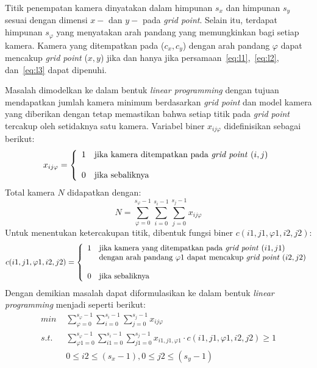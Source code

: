 Titik penempatan kamera dinyatakan dalam himpunan \(s_x\) dan himpunan \(s_y\) sesuai dengan dimensi \(x-\) dan \(y-\) pada \textit{grid point}. Selain itu, terdapat himpunan \(s_\varphi\) yang menyatakan arah pandang yang memungkinkan bagi setiap kamera. Kamera yang ditempatkan pada (\(c_x,c_y\)) dengan arah pandang \(\varphi\) dapat mencakup \textit{grid point} (\(x,y\)) jika dan hanya jika persamaan~\ref{eq:l1},~\ref{eq:l2}, dan~\ref{eq:l3} dapat dipenuhi.

Masalah dimodelkan ke dalam bentuk \textit{linear programming} dengan tujuan mendapatkan jumlah kamera minimum berdasarkan \textit{grid point} dan model kamera yang diberikan dengan tetap memastikan bahwa setiap titik pada \textit{grid point} tercakup oleh setidaknya satu kamera. Variabel biner \(x_{ij\varphi}\) didefinisikan sebagai berikut:
\begin{equation}
	x_{ij\varphi}=\left\{
		\begin{array}{cl}
			1 & \text{jika kamera ditempatkan pada \textit{grid point} }(i,j)\\\\
			0 & \text{jika sebaliknya}
		\end{array}
	\right.
\end{equation}
Total kamera \(N\) didapatkan dengan:
\begin{equation}
	N=\sum_{\varphi=0}^{s_\varphi-1}\sum_{i=0}^{s_i-1}\sum_{j=0}^{s_j-1}x_{ij\varphi}
\end{equation}
Untuk menentukan ketercakupan titik, dibentuk fungsi biner \(c(i1,j1,\varphi1,i2,j2)\):
\begin{equation}
	c(i1,j1,\varphi1,i2,j2)=\left \{
		\begin{array}{cl}
			1 & \text{jika kamera yang ditempatkan pada \textit{grid point} }(i1,j1)\\
			 & \text{dengan arah pandang }\varphi{1}\text{ dapat mencakup \textit{grid point} }(i2,j2)\\\\
			 0 & \text{jika sebaliknya}
		\end{array}
	\right.
\end{equation}
Dengan demikian masalah dapat diformulasikan ke dalam bentuk \textit{linear programming} menjadi seperti berikut:
\begin{equation}
	\begin{split}
		\textit{min } & \sum_{\varphi=0}^{s_\varphi-1}\sum_{i=0}^{s_i-1}\sum_{j=0}^{s_j-1}x_{ij\varphi}\\
		\textit{s.t. } & \sum_{\varphi{1}=0}^{s_\varphi-1}\sum_{i1=0}^{s_i-1}\sum_{j1=0}^{s_j-1}x_{i1,j1,\varphi{1}}\cdot c(i1,j1,\varphi1,i2,j2)\geq 1\\
		&0\leq i2\leq(s_x-1), 0\leq j2\leq(s_y-1)
	\end{split}
	\label{eq:lpformhorster}
\end{equation}
